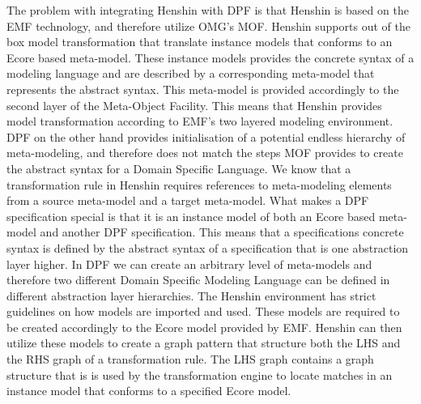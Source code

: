 The problem with integrating Henshin with DPF is that Henshin is based on the
EMF technology, and therefore utilize OMG's MOF. Henshin supports out of the
box model transformation that translate instance models that conforms to an
Ecore based meta-model. These instance models provides the concrete syntax of a
modeling language and are described by a corresponding meta-model that
represents the abstract syntax. This meta-model is provided accordingly to the
second layer of the Meta-Object Facility. This means that Henshin provides model
transformation according to EMF's two layered modeling environment. DPF on the
other hand provides initialisation of a potential endless hierarchy of
meta-modeling, and therefore does not match the steps MOF provides to create
the abstract syntax for a Domain Specific Language. We know that a
transformation rule in Henshin requires references to meta-modeling elements
from a source meta-model and a target meta-model. What makes a DPF
specification special is that it is an instance model of both an Ecore based
meta-model and another DPF specification. This means that a specifications
concrete syntax is defined by the abstract syntax of a specification that is one
abstraction layer higher. In DPF we can create an arbitrary level of
meta-models and therefore two different Domain Specific Modeling Language can
be defined in different abstraction layer hierarchies. The Henshin
environment has strict guidelines on how models are imported and used. These
models are required to be created accordingly to the Ecore model provided by
EMF. Henshin can then utilize these models to create a graph pattern that
structure both the LHS and the RHS graph of a transformation rule. The LHS
graph contains a graph structure that is is used by the transformation engine
to locate matches in an instance model that conforms to a specified Ecore
model.


